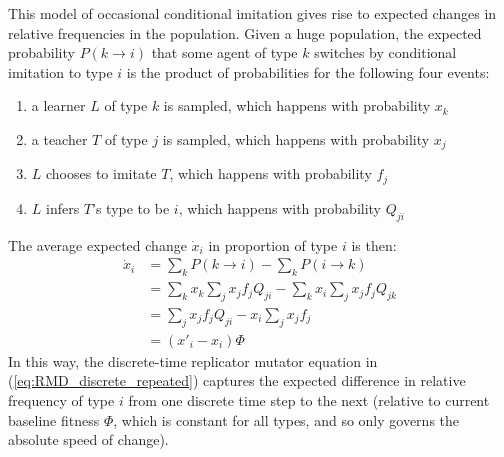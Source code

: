 \documentclass[a4paper, 11pt]{article}
\theoremstyle{Satz}
\begin{document}
This model of occasional conditional imitation gives rise to expected changes in relative
frequencies in the population. Given a huge population, the expected probability
$P(k \rightarrow i)$ that some agent of type $k$ switches by conditional imitation to type $i$
is the product of probabilities for the following four events:
\begin{enumerate}
\item a learner $L$ of type $k$ is sampled, which happens with probability $x_k$
\item a teacher $T$ of type $j$ is sampled, which happens with probability $x_j$
\item $L$ chooses to imitate $T$, which happens with probability $f_j$
\item $L$ infers $T$'s type to be $i$, which happens with probability $Q_{ji}$
\end{enumerate}
The average expected change $\dot{x}_i$ in proportion of type $i$ is then:
\begin{align*}
  \dot{x}_i & = \sum_k P(k \rightarrow i) - \sum_k P(i \rightarrow k) \\ 
  & = \sum_k x_k \sum_j x_j f_j Q_{ji} -   \sum_k x_i \sum_j x_j f_j Q_{jk} \\
  & = \sum_j x_j f_j Q_{ji} -   x_i \sum_j x_j f_j \\
  & =   (x'_i - x_i) \Phi
\end{align*}
In this way, the discrete-time replicator mutator equation in (\ref{eq:RMD_discrete_repeated})
captures the expected difference in relative frequency of type $i$ from one discrete time step
to the next (relative to current baseline fitness $\Phi$, which is constant for all types, and
so only governs the absolute speed of change).



\end{document}
